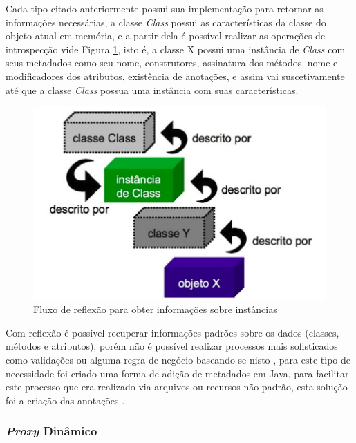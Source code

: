 \par Cada tipo citado anteriormente possui sua implementação para retornar as informações necessárias, a classe \textit{Class} possui as características da classe do objeto atual em memória, e a partir dela é possível realizar as operações de introspecção vide Figura \ref{fig:introspeccao-flow}, isto é, a classe X possui uma instância de \textit{Class} com seus metadados como seu nome, construtores, assinatura dos métodos, nome e modificadores dos atributos, existência de anotações, e assim vai suscetivamente até que a classe \textit{Class} possua uma instância com suas características.

\begin{figure}[H]
    \centering
    \includegraphics[scale=0.4]{src/imagens/cap2/reflection-diagrama.png}
    \caption{Fluxo de reflexão para obter informações sobre instâncias}
    \label{fig:introspeccao-flow}
\end{figure}

\par Com reflexão é possível recuperar informações padrões sobre os dados (classes, métodos e atributos), porém não é possível realizar processos mais sofisticados como validações ou alguma regra de negócio baseando-se nisto \cite{guerra2010architectural}, para este tipo de necessidade foi criado uma forma de adição de metadados em Java, para facilitar este processo que era realizado via arquivos ou recursos não padrão, esta solução foi a criação das anotações .

\subsubsection{\textit{Proxy} Dinâmico}

